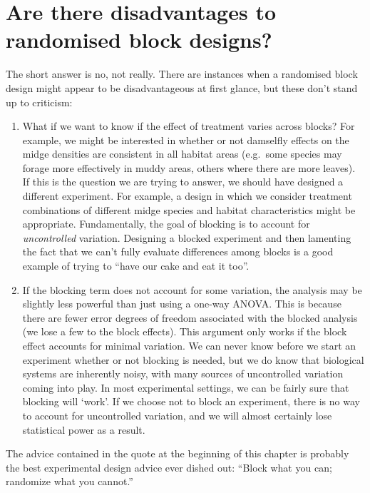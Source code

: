 \documentclass[
]{book}
\begin{document}
\hypertarget{are-there-disadvantages-to-randomised-block-designs}{%
\section{Are there disadvantages to randomised block designs?}\label{are-there-disadvantages-to-randomised-block-designs}}

The short answer is no, not really. There are instances when a randomised block design might appear to be disadvantageous at first glance, but these don't stand up to criticism:

\begin{enumerate}
\def\labelenumi{\arabic{enumi}.}
\item
  What if we want to know if the effect of treatment varies across blocks? For example, we might be interested in whether or not damselfly effects on the midge densities are consistent in all habitat areas (e.g.~some species may forage more effectively in muddy areas, others where there are more leaves). If this is the question we are trying to answer, we should have designed a different experiment. For example, a design in which we consider treatment combinations of different midge species and habitat characteristics might be appropriate. Fundamentally, the goal of blocking is to account for \emph{uncontrolled} variation. Designing a blocked experiment and then lamenting the fact that we can't fully evaluate differences among blocks is a good example of trying to ``have our cake and eat it too''.
\item
  If the blocking term does not account for some variation, the analysis may be slightly less powerful than just using a one-way ANOVA. This is because there are fewer error degrees of freedom associated with the blocked analysis (we lose a few to the block effects). This argument only works if the block effect accounts for minimal variation. We can never know before we start an experiment whether or not blocking is needed, but we do know that biological systems are inherently noisy, with many sources of uncontrolled variation coming into play. In most experimental settings, we can be fairly sure that blocking will `work'. If we choose not to block an experiment, there is no way to account for uncontrolled variation, and we will almost certainly lose statistical power as a result.
\end{enumerate}

The advice contained in the quote at the beginning of this chapter is probably the best experimental design advice ever dished out: ``Block what you can; randomize what you cannot.''
\end{document}
